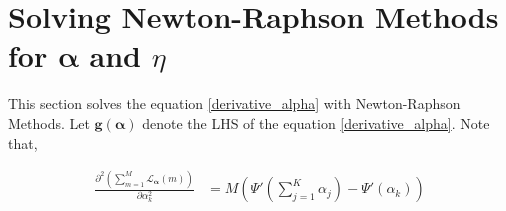 \documentclass[a4]{article}
\begin{document}
\section{Solving Newton-Raphson Methods for $\bm{\alpha}$ and $\eta$}\label{newton raphson}
This section solves the equation \ref{derivative_alpha} with Newton-Raphson Methods.
Let $\mathbf{g}(\bm{\alpha})$ denote the LHS of the equation \ref{derivative_alpha}.
Note that,

\begin{equation}
\begin{aligned}
    \frac{ \partial^2 \left(\sum_{m=1}^M \mathcal{L}_{\bm{\alpha}}(m) \right) }
         { \partial\alpha_k^2 }
    &= M \left( \Psi'( \sum_{j=1}^{K} \alpha_j ) - \Psi'(\alpha_k) \right)\\
\end{aligned}
\end{equation}
\end{document}
